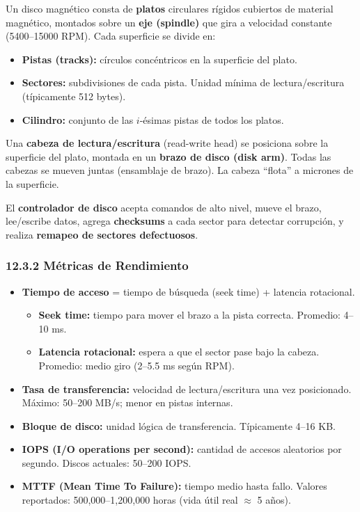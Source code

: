 \documentclass[11pt, a4paper]{article}
\begin{document}
Un disco magnético consta de \textbf{platos} circulares rígidos cubiertos de material magnético, montados sobre un \textbf{eje (spindle)} que gira a velocidad constante (5400--15000 RPM). Cada superficie se divide en:
\begin{itemize}[nosep]
	\item \textbf{Pistas (tracks):} círculos concéntricos en la superficie del plato.
	\item \textbf{Sectores:} subdivisiones de cada pista. Unidad mínima de lectura/escritura (típicamente 512 bytes).
	\item \textbf{Cilindro:} conjunto de las $i$-ésimas pistas de todos los platos.
\end{itemize}

Una \textbf{cabeza de lectura/escritura} (read-write head) se posiciona sobre la superficie del plato, montada en un \textbf{brazo de disco (disk arm)}. Todas las cabezas se mueven juntas (ensamblaje de brazo). La cabeza ``flota'' a micrones de la superficie.

El \textbf{controlador de disco} acepta comandos de alto nivel, mueve el brazo, lee/escribe datos, agrega \textbf{checksums} a cada sector para detectar corrupción, y realiza \textbf{remapeo de sectores defectuosos}.

\subsubsection{12.3.2 Métricas de Rendimiento}

\begin{itemize}[nosep]
	\item \textbf{Tiempo de acceso} = tiempo de búsqueda (seek time) + latencia rotacional.
	      \begin{itemize}[nosep]
		      \item \textbf{Seek time:} tiempo para mover el brazo a la pista correcta. Promedio: 4--10 ms.
		      \item \textbf{Latencia rotacional:} espera a que el sector pase bajo la cabeza. Promedio: medio giro (2--5.5 ms según RPM).
	      \end{itemize}
	\item \textbf{Tasa de transferencia:} velocidad de lectura/escritura una vez posicionado. Máximo: 50--200 MB/s; menor en pistas internas.
	\item \textbf{Bloque de disco:} unidad lógica de transferencia. Típicamente 4--16 KB.
	\item \textbf{IOPS (I/O operations per second):} cantidad de accesos aleatorios por segundo. Discos actuales: 50--200 IOPS.
	\item \textbf{MTTF (Mean Time To Failure):} tiempo medio hasta fallo. Valores reportados: 500,000--1,200,000 horas (vida útil real $\approx$ 5 años).
\end{itemize}
\end{document}
